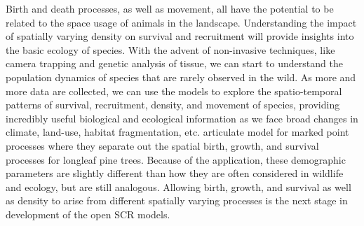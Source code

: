 Birth and death processes, as well as movement, all have the potential to be related to the space
usage of animals in the landscape.  Understanding the impact of spatially varying density on survival
and recruitment will provide insights into the basic ecology of species.  With the advent of
non-invasive techniques, like camera trapping and genetic analysis of tissue, we can start
to understand the population dynamics of species that are rarely observed in the wild.  As more and
more data are collected, we can use the models to explore the spatio-temporal patterns of survival,
recruitment, density, and movement of species, providing incredibly useful biological and ecological
information as we face broad changes in climate, land-use, habitat
fragmentation, etc.   \citet{rathbun_cressie:1994} articulate model for
marked point processes where they separate out the spatial birth, growth, and survival processes for longleaf
pine trees.  Because of the application, these demographic parameters are slightly different than how they are
often considered in wildlife and ecology, but are still analogous.  Allowing birth, growth, and survival as well as density
to arise from different spatially varying processes is the next stage in development of the open SCR models.


